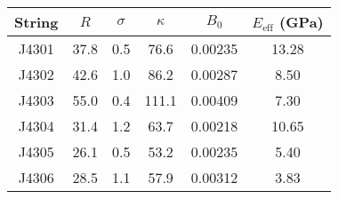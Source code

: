 \begin{tabular}{cccccc}
\toprule
String & $R$ & $\sigma$ & $\kappa$ & $B_0$ & $E_\mathrm{eff}$ (GPa) \\
\midrule
J4301 & 37.8 & 0.5 & 76.6 & 0.00235 & 13.28 \\
J4302 & 42.6 & 1.0 & 86.2 & 0.00287 & 8.50 \\
J4303 & 55.0 & 0.4 & 111.1 & 0.00409 & 7.30 \\
J4304 & 31.4 & 1.2 & 63.7 & 0.00218 & 10.65 \\
J4305 & 26.1 & 0.5 & 53.2 & 0.00235 & 5.40 \\
J4306 & 28.5 & 1.1 & 57.9 & 0.00312 & 3.83 \\
\bottomrule
\end{tabular}


